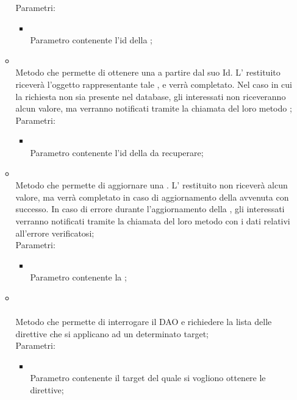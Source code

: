 \begin{itemize}
\begin{itemize}
		Parametri:
		\begin{itemize}
			\item {} \\
			Parametro contenente l'id della ;
		\end{itemize}
		\item[]  \\		Metodo che permette di ottenere una  a partire dal suo Id. L' restituito riceverà l'oggetto rappresentante tale , e verrà completato. Nel caso in cui la  richiesta non sia presente nel database, gli  interessati non riceveranno alcun valore, ma verranno notificati tramite la chiamata del loro metodo ;\\
		Parametri:
		\begin{itemize}
			\item {} \\
			Parametro contenente l'id della  da recuperare;
		\end{itemize}
		\item[]  \\		Metodo che permette di aggiornare una . L' restituito non riceverà alcun valore, ma verrà completato in caso di aggiornamento della  avvenuta con successo. In caso di errore durante l'aggiornamento della , gli  interessati verranno notificati tramite la chiamata del loro metodo  con i dati relativi all'errore verificatosi;\\
		Parametri:
		\begin{itemize}
			\item {} \\
			Parametro contenente la ;
		\end{itemize}
		\item[] \\ \\		Metodo che permette di interrogare il DAO e richiedere la lista delle direttive che si applicano ad un determinato target;\\
		Parametri:
		\begin{itemize}
			\item {} \\
			Parametro contenente il target del quale si vogliono ottenere le direttive;

\end{itemize}
\end{itemize}
\end{itemize}
